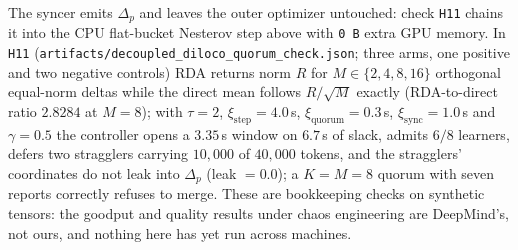 \documentclass[11pt,a4paper]{article}
\begin{document}
The syncer emits $\Delta_p$ and leaves the outer optimizer untouched: check \texttt{H11} chains it into the CPU flat-bucket Nesterov step above with \texttt{0\,B} extra GPU memory. In \texttt{H11} (\texttt{artifacts/decoupled\_diloco\_quorum\_check.json}; three arms, one positive and two negative controls) RDA returns norm $R$ for $M \in \{2,4,8,16\}$ orthogonal equal-norm deltas while the direct mean follows $R/\sqrt{M}$ exactly (RDA-to-direct ratio $\mathbf{2.8284}$ at $M=8$); with $\tau=2$, $\xi_{\text{step}}=4.0\,$s, $\xi_{\text{quorum}}=0.3\,$s, $\xi_{\text{sync}}=1.0\,$s and $\gamma = 0.5$ the controller opens a $\mathbf{3.35}\,$s window on $6.7\,$s of slack, admits $6/8$ learners, defers two stragglers carrying $10{,}000$ of $40{,}000$ tokens, and the stragglers' coordinates do not leak into $\Delta_p$ (leak $= 0.0$); a $K = M = 8$ quorum with seven reports correctly refuses to merge. These are bookkeeping checks on synthetic tensors: the goodput and quality results under chaos engineering are DeepMind's, not ours, and nothing here has yet run across machines.
\end{document}

